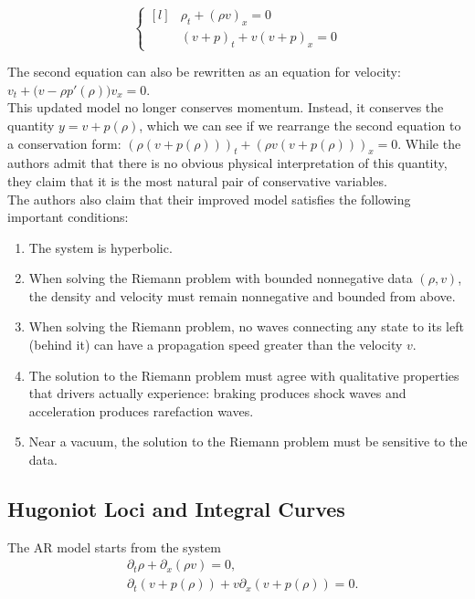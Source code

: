 \documentclass{article}
\begin{document}
\[ \left\{ \begin{matrix*}[l] & \rho_t + (\rho v)_x = 0 \\[1ex] & (v + p)_t + v (v + p)_x = 0 \end{matrix*} \right. \]

The second equation can also be rewritten as an equation for velocity: $v_t + \Big(v - \rho p'(\rho)\Big)v_x = 0$. \\

This updated model no longer conserves momentum.  Instead, it conserves the quantity $y = v + p(\rho)$, which we can see if we rearrange the second equation to a conservation form: $(\rho (v + p(\rho)))_t + (\rho v(v + p(\rho)))_x = 0$. While the authors admit that there is no obvious physical interpretation of this quantity, they claim that it is the most natural pair of conservative variables. \\

The authors also claim that their improved model satisfies the following important conditions:
\begin{enumerate}
\item The system is hyperbolic.
\item When solving the Riemann problem with bounded nonnegative data $(\rho, v)$, the density and velocity must remain nonnegative and bounded from above.
\item When solving the Riemann problem, no waves connecting any state to its left (behind it) can have a propagation speed greater than the velocity $v$.
\item The solution to the Riemann problem must agree with qualitative properties that drivers actually experience: braking produces shock waves and acceleration produces rarefaction waves.
\item Near a vacuum, the solution to the Riemann problem must be sensitive to the data.
\end{enumerate}

\subsection{Hugoniot Loci and Integral Curves}
The AR model starts from the system
\begin{align}
&\partial_t\rho + \partial_x(\rho v) = 0, \label{AW:eq1}\\
&\partial_t \left(v + p(\rho )\right) + v\partial_x \left( v + p(\rho )\right) = 0.
\end{align}
\end{document}
